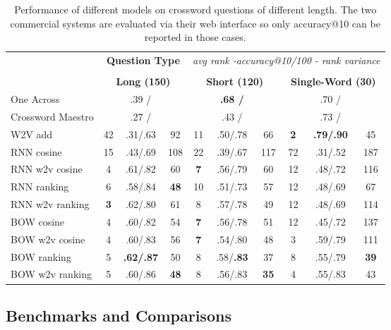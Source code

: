 \documentclass[11pt,letterpaper]{article}
\begin{document}
\begin{table*}[ht]
{\small
\hfill{}
\begin{tabular}{l|ccc|ccc|ccc|}
\multicolumn{1}{c}{} & \multicolumn{3}{c}{{\bf Question Type }}& \multicolumn{6}{|c|}{\emph{avg rank -accuracy@10/100 - rank variance} } \\
\multicolumn{10}{c}{} \\
\multicolumn{1}{c}{\textbf{}}&\multicolumn{3}{|c|}{\textbf{Long (150)}}& \multicolumn{3}{|c|}{\textbf{Short (120)}} & \multicolumn{3}{|c|}{\textbf{Single-Word (30)}}  \\
\hline
One Across & & .39 / && & \bf .68 / &&& .70 / &  \\
Crossword Maestro& & .27 /&& & .43 /&&& .73 / & \\
\hdashline
W2V add & 42  & .31/.63 & 92  & 11 & .50/.78 & 66 & \bf 2 & \bf .79/.90 & 45  \\
\hdashline
RNN cosine	& 15 &  .43/.69 & 108 & 22 & .39/.67 & 117 & 72 & .31/.52 & 187 \\
RNN w2v cosine &	4 & .61/.82 & 60 & \bf 7 & .56/.79 & 60 & 12 & .48/.72 & 116 \\
RNN ranking 	& 6 & .58/.84 & \bf 48 & 10 & .51/.73 & 57 & 12 & .48/.69 & 67 \\
RNN w2v ranking &	\bf 3 & .62/.80 & 61 & 8 & .57/.78 & 49 & 12 & .48/.69 & 114 \\
BOW cosine & 4 & .60/.82 & 54 & \bf 7 & .56/.78 & 51 & 12 & .45/.72 & 137 \\
BOW w2v cosine & 4 & .60/.83 & 56 & \bf 7  & .54/.80 & 48 & 3 & .59/.79 & 111 \\
BOW ranking	& 5 & \bf .62/.87 & 50 & 8 & .58/\bf .83 & 37 & 8 & .55/.79 & \bf 39 \\
BOW w2v ranking & 5 & .60/.86 & \bf 48 & 8 & .56/.83 & \bf 35 & 4 & .55/.83 & 43 \\
\end{tabular}}
\hfill{}
\caption{Performance of different models on crossword questions of different length. The two commercial systems are evaluated via their web interface so only accuracy@10 can be reported in those cases. }
\label{results2}
\label{tb:tablename}
\end{table*}

\subsection{Benchmarks and Comparisons}
\end{document}
